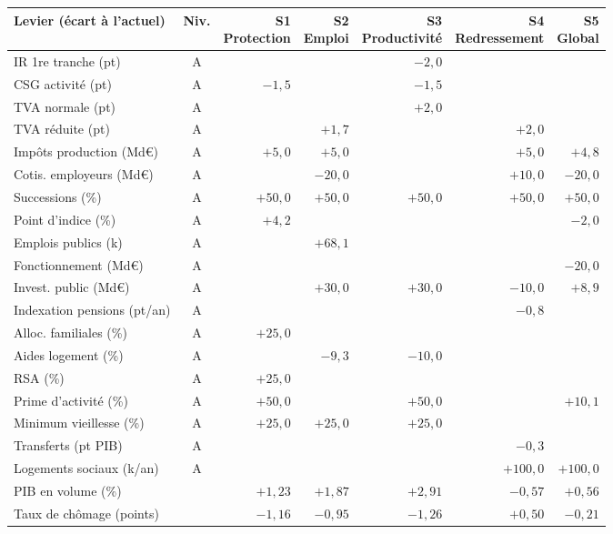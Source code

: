 \begin{tabular}{p{4.8cm}crrrrr}\toprule Levier (écart à l'actuel) & Niv. & \makecell{S1\\ Protection} & \makecell{S2\\ Emploi} & \makecell{S3\\ Productivité} & \makecell{S4\\ Redressement} & \makecell{S5\\ Global}\\ \midrule
IR 1re tranche (pt) & A &  &  & $-2{,}0$ &  & \\
CSG activité (pt) & A & $-1{,}5$ &  & $-1{,}5$ &  & \\
TVA normale (pt) & A &  &  & $+2{,}0$ &  & \\
TVA réduite (pt) & A &  & $+1{,}7$ &  & $+2{,}0$ & \\
Impôts production (Md€) & A & $+5{,}0$ & $+5{,}0$ &  & $+5{,}0$ & $+4{,}8$\\
Cotis. employeurs (Md€) & A &  & $-20{,}0$ &  & $+10{,}0$ & $-20{,}0$\\
Successions (\%) & A & $+50{,}0$ & $+50{,}0$ & $+50{,}0$ & $+50{,}0$ & $+50{,}0$\\
Point d'indice (\%) & A & $+4{,}2$ &  &  &  & $-2{,}0$\\
Emplois publics (k) & A &  & $+68{,}1$ &  &  & \\
Fonctionnement (Md€) & A &  &  &  &  & $-20{,}0$\\
Invest. public (Md€) & A &  & $+30{,}0$ & $+30{,}0$ & $-10{,}0$ & $+8{,}9$\\
Indexation pensions (pt/an) & A &  &  &  & $-0{,}8$ & \\
Alloc. familiales (\%) & A & $+25{,}0$ &  &  &  & \\
Aides logement (\%) & A &  & $-9{,}3$ & $-10{,}0$ &  & \\
RSA (\%) & A & $+25{,}0$ &  &  &  & \\
Prime d'activité (\%) & A & $+50{,}0$ &  & $+50{,}0$ &  & $+10{,}1$\\
Minimum vieillesse (\%) & A & $+25{,}0$ & $+25{,}0$ & $+25{,}0$ &  & \\
Transferts (pt PIB) & A &  &  &  & $-0{,}3$ & \\
Logements sociaux (k/an) & A &  &  &  & $+100{,}0$ & $+100{,}0$\\
\midrule
PIB en volume (\%) & & $+1{,}23$ & $+1{,}87$ & $+2{,}91$ & $-0{,}57$ & $+0{,}56$\\
Taux de chômage (points) & & $-1{,}16$ & $-0{,}95$ & $-1{,}26$ & $+0{,}50$ & $-0{,}21$\\

\end{tabular}
